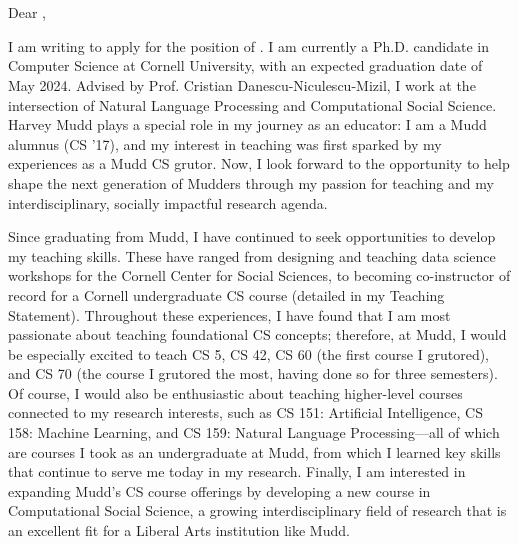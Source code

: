 \documentclass[12pt]{letter}
\begin{document}
\signature{Jonathan P. Chang}
\begin{letter}{
\department \\
\schoolnamelong \\
\schooladdress
}

\opening{
    Dear ,
}

I am writing to apply for the position of \position.
I am currently a Ph.D. candidate in Computer Science at Cornell University, with an expected graduation date of May 2024.
Advised by Prof. Cristian Danescu-Niculescu-Mizil, I work at the intersection of Natural Language Processing and Computational Social Science.
Harvey Mudd plays a special role in my journey as an educator: I am a Mudd alumnus (CS '17), and my interest in teaching was first sparked by my experiences as a Mudd CS grutor.
Now, I look forward to the opportunity to help shape the next generation of Mudders through my passion for teaching and my interdisciplinary, socially impactful research agenda.

Since graduating from Mudd, I have continued to seek opportunities to develop my teaching skills.
These have ranged from designing and teaching data science workshops for the Cornell Center for Social Sciences, to becoming co-instructor of record for a Cornell undergraduate CS course (detailed in my Teaching Statement).
Throughout these experiences, I have found that I am most passionate about teaching foundational CS concepts; therefore, at Mudd, I would be especially excited to teach CS 5, CS 42, CS 60 (the first course I grutored), and CS 70 (the course I grutored the most, having done so for three semesters).
Of course, I would also be enthusiastic about teaching higher-level courses connected to my research interests, such as CS 151: Artificial Intelligence, CS 158: Machine Learning, and CS 159: Natural Language Processing---all of which are courses I took as an undergraduate at Mudd, from which I learned key skills that continue to serve me today in my research.
Finally, I am interested in expanding Mudd's CS course offerings by developing a new course in Computational Social Science, a growing interdisciplinary field of research that is an excellent fit for a Liberal Arts institution like Mudd.


\end{letter}
\end{document}
